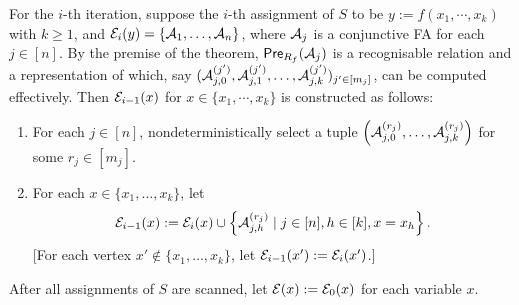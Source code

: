 For the $i$-th iteration, suppose the $i$-th assignment of $S$ to be $y:= f(x_1, \cdots, x_k)$ with $k\geq 1$, and  $\mathcal{E}_i(y)=\{\mathcal{A}_1, \ldots, \mathcal{A}_n\}$, 
where $\mathcal{A}_j$ is a conjunctive FA for each $j \in [n]$.
By the premise of the theorem, $\textsf{Pre}_{R_f}(\mathcal{A}_j)$ is a recognisable relation and a representation of which, say $(\mathcal{A}^{(j')}_{j, 0}, \mathcal{A}^{(j')}_{j, 1}, \ldots, \mathcal{A}^{(j')}_{j, k})_{ j'  \in [m_j]}$, can be computed effectively.
Then $\mathcal{E}_{i-1}(x)$ for $x \in  \{x_1,\cdots, x_k\}$ is constructed as follows: %
\begin{enumerate}
\item For each $j \in [n]$, nondeterministically select a tuple $\left(\mathcal{A}^{(r_j)}_{j, 0}, \ldots, \mathcal{A}^{(r_j)}_{j, k}\right)$ for some $r_j \in [m_j]$.
%
\item For each $x \in \{x_1,\ldots, x_k\}$, let
\[
    \mathcal{E}_{i-1}(x):= \mathcal{E}_{i}(x) \cup \left\{\mathcal{A}^{(r_j)}_{j, h} \mid  j \in [n], h \in [k], x = x_h \right\}.
\]
[For each vertex $x'  {\notin} \{x_1,\ldots, x_k\}$, let $\mathcal{E}_{i-1}(x') := \mathcal{E}_i(x')$.]
%
\end{enumerate}
%
After all assignments of $S$ are scanned,  let $\mathcal{E}(x):=\mathcal{E}_{0}(x)$ for each variable $x$.


